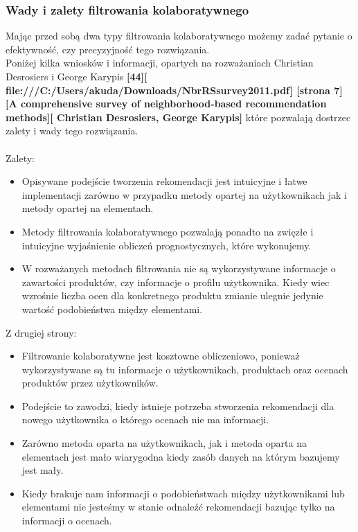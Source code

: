 \documentclass[12pt,a4paper]{report}
\begin{document}
\subsubsection{Wady i zalety filtrowania kolaboratywnego}
Mając przed sobą dwa typy filtrowania kolaboratywnego możemy zadać pytanie o efektywność, czy precyzyjność tego rozwiązania.
\\Poniżej kilka wniosków i informacji, opartych na rozważaniach Christian Desrosiers i George Karypis \textbf{[44][ file:///C:/Users/akuda/Downloads/NbrRSsurvey2011.pdf] [strona 7] [A comprehensive survey of neighborhood-based recommendation methods][ Christian Desrosiers, George Karypis]} które pozwalają dostrzec zalety i wady tego rozwiązania.
\\ 
\\Zalety:
\begin{itemize}
\item Opisywane podejście tworzenia rekomendacji jest intuicyjne i łatwe implementacji zarówno w przypadku metody opartej na użytkownikach jak i metody opartej na elementach. 
\item Metody filtrowania kolaboratywnego pozwalają ponadto na zwięzłe i intuicyjne wyjaśnienie obliczeń prognostycznych, które wykonujemy.
\item W rozważanych metodach filtrowania nie są wykorzystywane informacje o zawartości produktów, czy informacje o profilu użytkownika. Kiedy wiec wzrośnie liczba ocen dla konkretnego produktu zmianie ulegnie jedynie wartość podobieństwa między elementami.
\end{itemize}
Z drugiej strony:
\begin{itemize}
\item Filtrowanie kolaboratywne jest kosztowne obliczeniowo, ponieważ wykorzystywane są tu informacje o użytkownikach, produktach oraz ocenach produktów przez użytkowników. 
\item Podejście to zawodzi, kiedy istnieje potrzeba stworzenia rekomendacji dla nowego użytkownika o którego ocenach nie ma informacji.
\item Zarówno metoda oparta na użytkownikach, jak i metoda oparta na elementach jest mało wiarygodna kiedy zasób danych na którym bazujemy jest mały.
\item Kiedy brakuje nam informacji o podobieństwach między użytkownikami lub elementami nie jesteśmy w stanie odnaleźć rekomendacji bazując tylko na informacji o ocenach.
\end{itemize}
\end{document}
